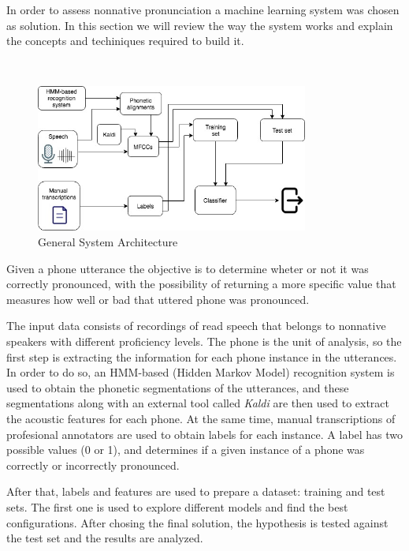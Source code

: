 In order to assess nonnative pronunciation a machine learning system was chosen as solution.
In this section we will review the way the system works and explain the concepts 
and techiniques required to build it.

~

\begin{figure}[H]
	\centering
	\includegraphics[width=0.8\textwidth]{files/figures/method/general-structure.jpg}
	\caption{General System Architecture}
	\label{fig:methodGeneralArchitecture}
\end{figure}

Given a phone utterance the objective is to determine wheter or not it was correctly
pronounced, with the possibility of returning
a more specific value that measures how well or bad that uttered phone
was pronounced.

The input data consists of recordings of read
speech that belongs to nonnative speakers with different proficiency levels.
The phone is the unit of analysis, so the first step is extracting the information
for each phone instance in the utterances.  In order to do so,
an HMM-based (Hidden Markov Model) recognition system is used to obtain the phonetic
segmentations of the utterances, and these segmentations along with an external tool
called \emph{Kaldi} are then used to extract the 
acoustic features for each phone. At the same time, manual transcriptions of profesional
annotators are used to obtain labels for each instance. A label has two possible values (0 or 1),
and determines if a given instance of a phone was correctly or incorrectly pronounced.

After that, labels and features are used to prepare a dataset: training and test sets. The first
one is used to explore different models and find the best configurations. 
After chosing the final solution, the hypothesis is tested against the test set 
and the results are analyzed.

